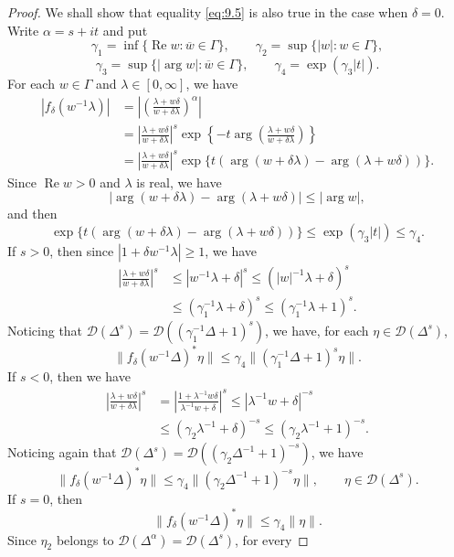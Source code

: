 \documentclass[12pt,b5paper,twoside]{article}
\theoremstyle{takesaki}
\numberwithin{equation}{section}
\begin{document}
\begin{proof}
We shall show that equality \eqref{eq:9.5} is also true in the case
when $\delta=0$.  Write $\alpha=s+it$ and put
\[
 \gamma_1=\inf\{\operatorname{Re}w:\overline w\in\Gamma\},
 \qquad
 \gamma_2=\sup\{|w|:w\in\Gamma\},
\]
\[
 \gamma_3=\sup\{|\arg w|:\overline w\in\Gamma\},
 \qquad
 \gamma_4=\exp(\gamma_3|t|).
\]
For each $w\in\Gamma$ and $\lambda\in[0,\infty]$, we have
\begin{align*}
 |f_\delta(w^{-1}\lambda)|
 &=\left|\left(\frac{\lambda+w\delta}
 {w+\delta\lambda}\right)^\alpha\right|\\
 &=\left|\frac{\lambda+w\delta}{w+\delta\lambda}\right|^s
 \exp\left\{-t\arg\left(\frac{\lambda+w\delta}
 {w+\delta\lambda}\right)\right\}\\
 &=\left|\frac{\lambda+w\delta}{w+\delta\lambda}\right|^s
 \exp\{t(\arg(w+\delta\lambda)-\arg(\lambda+w\delta))\}.
\end{align*}
Since $\operatorname{Re}w>0$ and $\lambda$ is real, we have
\[
 |\arg(w+\delta\lambda)-\arg(\lambda+w\delta)|\leq|\arg w|,
\]
and then
\[
 \exp\{t(\arg(w+\delta\lambda)-\arg(\lambda+w\delta))\}
 \leq\exp(\gamma_3|t|)\leq\gamma_4.
\]
If $s>0$, then since $|1+\delta w^{-1}\lambda|\geq1$, we have
\begin{align*}
 \left|\frac{\lambda+w\delta}{w+\delta\lambda}\right|^s
 &\leq|w^{-1}\lambda+\delta|^s
 \leq(|w|^{-1}\lambda+\delta)^s\\
 &\leq(\gamma_1^{-1}\lambda+\delta)^s
 \leq(\gamma_1^{-1}\lambda+1)^s.
\end{align*}
Noticing that
$\mathcal D(\Delta^s)=\mathcal D((\gamma_1^{-1}\Delta+1)^s)$, we
have, for each $\eta\in\mathcal D(\Delta^s)$,
\[
 \|f_\delta(w^{-1}\Delta)^*\eta\|
 \leq\gamma_4\|(\gamma_1^{-1}\Delta+1)^s\eta\|.
\]
If $s<0$, then we have
\begin{align*}
 \left|\frac{\lambda+w\delta}{w+\delta\lambda}\right|^s
 &=\left|\frac{1+\lambda^{-1}w\delta}
 {\lambda^{-1}w+\delta}\right|^s
 \leq|\lambda^{-1}w+\delta|^{-s}\\
 &\leq(\gamma_2\lambda^{-1}+\delta)^{-s}
 \leq(\gamma_2\lambda^{-1}+1)^{-s}.
\end{align*}
Noticing again that
$\mathcal D(\Delta^s)=\mathcal D((\gamma_2\Delta^{-1}+1)^{-s})$, we
have
\[
 \|f_\delta(w^{-1}\Delta)^*\eta\|
 \leq\gamma_4\|(\gamma_2\Delta^{-1}+1)^{-s}\eta\|,
 \qquad \eta\in\mathcal D(\Delta^s).
\]
If $s=0$, then
\[
 \|f_\delta(w^{-1}\Delta)^*\eta\|\leq\gamma_4\|\eta\|.
\]
Since $\eta_2$ belongs to
$\mathcal D(\Delta^\alpha)=\mathcal D(\Delta^s)$, for every

\end{proof}
\end{document}
